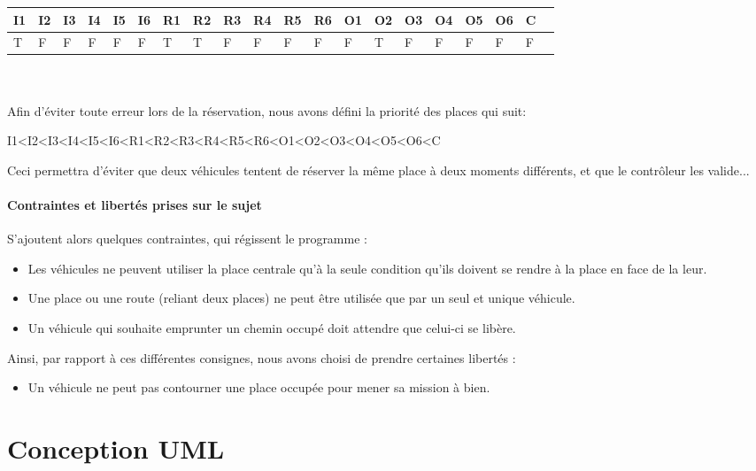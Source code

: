 \documentclass[a4paper, titlepage]{report}
\begin{document}
\begin{tabular}{|l|l|l|l|l|l|l|l|l|l|l|l|l|l|l|l|l|l|l|l|}

\hline
  I1 & I2 & I3 & I4 & I5 & I6 & R1 & R2 & R3 & R4 & R5 & R6 & O1 & O2 & O3 & O4 & O5 & O6 & C \\
  \hline
   T & F & F & F & F & F & T & T & F & F & F & F & F & T & F & F & F & F & F\\
 \hline

\end{tabular}\\
\vspace{0.25cm}\\
Afin d'éviter toute erreur lors de la réservation, nous avons défini la priorité des places qui suit:
\begin{center}
I1<I2<I3<I4<I5<I6<R1<R2<R3<R4<R5<R6<O1<O2<O3<O4<O5<O6<C
\end{center}
Ceci permettra d'éviter que deux véhicules tentent de réserver la même place à deux moments différents, et que le contrôleur les valide...

\subsection{Contraintes et libertés prises sur le sujet}


S'ajoutent alors quelques contraintes, qui régissent le programme :
\begin{itemize}
  \item Les véhicules ne peuvent utiliser la place centrale qu'à la seule condition qu'ils doivent se rendre à la place en face de la leur.
  \item Une place ou une route (reliant deux places) ne peut être utilisée que par un seul et unique véhicule.
  \item Un véhicule qui souhaite emprunter un chemin occupé doit attendre que celui-ci se libère.
\end{itemize}
\vspace{0.25cm}
Ainsi, par rapport à ces différentes consignes, nous avons choisi de prendre certaines libertés :
\vspace{0.25cm}
\begin{itemize}
  \item Un véhicule ne peut pas contourner une place occupée pour mener sa mission à bien.
\end{itemize}
\setcounter{chapter}{0}
\setcounter{section}{0}
\part{Conception UML}
\end{document}
